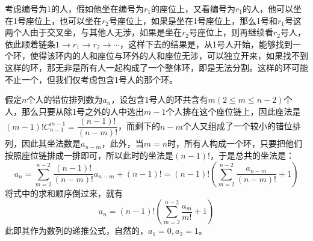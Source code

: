 \begin{example}[伯努利信封问题]
考虑编号为1的人，假如他坐在编号为$r_1$的座位上，又看编号为$r_1$的人，他可以坐在1号座位上，也可以坐在$r_2$号座位上，如果是坐在1号座位上，那么1号和$r_1$号这两个人由于交叉坐，与其他人无涉，如果是坐在$r_2$号座位上，则再继续看$r_2$号人，依此顺着链条$1\rightarrow r_1 \rightarrow r_2 \rightarrow \cdots$，这样下去的结果是，从1号人开始，能够找到一个环，使得该环内的人和座位与环外的人和座位无涉，可以独立开来，如果找不到这样的环，那无非是所有人一起构成了一个整体环，即是无法分割。这样的环可能不止一个，但我们仅考虑包含1号人的那个环。

假定$n$个人的错位排列数为$a_n$，设包含1号人的环共含有$m(2\leqslant m \leqslant n-2)$个人，那么只要从除1号之外的人中选出$m-1$个人排在这个座位链上，因此座法是$(m-1)!C_{n-1}^{m-1}=\dfrac{(n-1)!}{(n-m)!}$，而剩下的$n-m$个人又组成了一个较小的错位排列，因此其坐法数是$a_{n-m}$，此外，当$m=n$时，所有人构成一个环，只要把他们按照座位链排成一排即可，所以此时的坐法是$(n-1)!$，于是总共的坐法是：
\begin{equation*}
  a_n=\sum_{m=2}^{n-2}\frac{(n-1)!}{(n-m)!}a_{n-m}+(n-1)!=(n-1)!(\sum_{m=2}^{n-2}\frac{a_{n-m}}{(n-m)!}+1)
\end{equation*}
将式中的求和顺序倒过来，就有
\begin{equation}
  \label{eq:requsive-equation-derangement}
  a_n=(n-1)!(\sum_{m=2}^{n-2}\frac{a_{m}}{m!}+1)
\end{equation}
此即其作为数列的递推公式，自然的，$a_1=0,a_2=1$。


\end{example}
